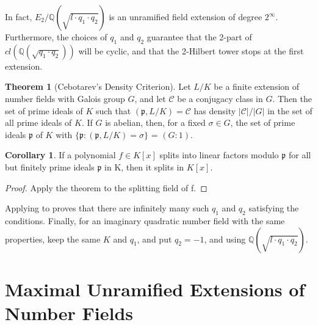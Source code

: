 \documentclass[12pt]{extarticle}
\newcommand{\Q}{\mathbb{Q}}
\newcommand{\<}{\langle}
\renewcommand{\>}{\rangle}
\theoremstyle{definition}
\newtheorem{theorem}{Theorem}
\newtheorem{corollary}{Corollary}
\begin{document}
\begin{center}
\end{center}
In fact, $E_2/\Q(\sqrt{l \cdot q_1 \cdot q_2})$ is an unramified field extension of degree $2^{\infty}$. Furthermore, the choices of $q_1$ and $q_2$ guarantee that the 2-part of $cl(\Q(\sqrt{q_1 \cdot q_2}))$ will be cyclic, and that the 2-Hilbert tower stops at the first extension. 


\begin{theorem}[Cebotarev's Density Criterion]
Let $L/K$ be a finite extension of
number fields with Galois group $G$, and let $\mathcal{C}$ be a conjugacy class in $G$. Then the set of
prime ideals of $K$ such that $(\mathfrak{p},L/K)=\mathcal{C}$ has density $|\mathcal{C}|/|G|$ in the set of all prime
ideals of $K$. If $G$ is abelian, then, for a fixed $\sigma \in G$, the set of prime ideals $\mathfrak{p}$ of $K$ with $\{\mathfrak{p}:(\mathfrak{p},L/K)=\sigma\}$  = $(G:1)$.
\end{theorem}
\begin{corollary}
\label{cor:ceb}
 If a polynomial $f \in K[x]$ splits into linear factors modulo $\mathfrak{p}$ for all but finitely prime ideals $\mathfrak{p}$ in K, then it splits in $K[x]$.
\end{corollary}
\begin{proof}
Apply the theorem to the splitting field of f.
\end{proof}
Applying  to  proves that there are infinitely many such $q_1$ and $q_2$ satisfying the conditions.
Finally, for an imaginary quadratic number field with the same properties, keep the same $K$ and $q_1$, and put $q_2=-1$, and using $\Q(\sqrt{l \cdot q_1 \cdot q_2})$. 




\section{Maximal Unramified Extensions of Number Fields}
\end{document}
